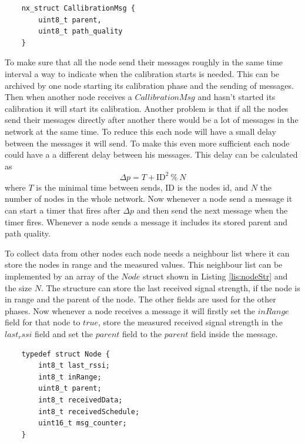 \begin{lstlisting}
	nx_struct CallibrationMsg {
		uint8_t parent,
		uint8_t path_quality
	}
\end{lstlisting}

To make sure that all the node send their messages roughly in the same time interval a way to indicate when the calibration starts is needed. This can be archived by one node starting its calibration phase and the sending of messages. Then when another node receives a $CallibrationMsg$ and hasn't started its calibration it will start its calibration. Another problem is that if all the nodes send their messages directly after another there would be a lot of messages in the network at the same time. To reduce this each node will have a small delay between the messages it will send. To make this even more sufficient each node could have a a different delay between his messages. This delay can be calculated as  
\[ \Delta p = T + \mbox{ID}^2\ \%\ N\]
where $T$ is the minimal time between sends, ID is the nodes id, and $N$ the number of nodes in the whole network. Now whenever a node send a message it can start a timer that fires after $\Delta p$ and then send the next message when the timer fires. Whenever a node sends a message it includes its stored parent and path quality.  

To collect data from other nodes each node needs a neighbour list where it can store the nodes in range and the measured values. This neighbour list can be implemented by an array of the $Node$ struct shown in Listing \ref{lis:nodeStr} and the size $N$. The structure can store the last received signal strength, if the node is in range and the parent of the node. The other fields are used for the other phases. Now whenever a node receives a message it will firstly set the $inRange$ field for that node to $true$, store the measured received signal strength in the $last_rssi$ field and set the $parent$ field to the $parent$ field inside the message. 
 

\begin{lstlisting}
	typedef struct Node {
  		int8_t last_rssi;
  		int8_t inRange;
  		uint8_t parent;
  		int8_t receivedData;
  		int8_t receivedSchedule;
  		uint16_t msg_counter;
	}
\end{lstlisting}

